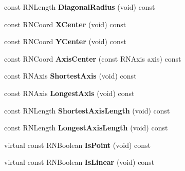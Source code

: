 \begin{DoxyCompactItemize}
\item 
const R\+N\+Length {\bfseries Diagonal\+Radius} (void) const \hypertarget{class_r2_box_a00ab031acf3086b5c738e409072628b9}{}\label{class_r2_box_a00ab031acf3086b5c738e409072628b9}

\item 
const R\+N\+Coord {\bfseries X\+Center} (void) const \hypertarget{class_r2_box_a4d7137a8b33d25073488f9beb6fee01b}{}\label{class_r2_box_a4d7137a8b33d25073488f9beb6fee01b}

\item 
const R\+N\+Coord {\bfseries Y\+Center} (void) const \hypertarget{class_r2_box_ad5a3bbf14b4905e364ad04a305c669aa}{}\label{class_r2_box_ad5a3bbf14b4905e364ad04a305c669aa}

\item 
const R\+N\+Coord {\bfseries Axis\+Center} (const R\+N\+Axis axis) const \hypertarget{class_r2_box_af3af7a7848270df64621b09bf4678ad0}{}\label{class_r2_box_af3af7a7848270df64621b09bf4678ad0}

\item 
const R\+N\+Axis {\bfseries Shortest\+Axis} (void) const \hypertarget{class_r2_box_a7168b00e526e0881910495d3335b5f9f}{}\label{class_r2_box_a7168b00e526e0881910495d3335b5f9f}

\item 
const R\+N\+Axis {\bfseries Longest\+Axis} (void) const \hypertarget{class_r2_box_a65ba59f99e319f658d460b3fd3f9807e}{}\label{class_r2_box_a65ba59f99e319f658d460b3fd3f9807e}

\item 
const R\+N\+Length {\bfseries Shortest\+Axis\+Length} (void) const \hypertarget{class_r2_box_adf1422c1522ea28a7f7014b531634996}{}\label{class_r2_box_adf1422c1522ea28a7f7014b531634996}

\item 
const R\+N\+Length {\bfseries Longest\+Axis\+Length} (void) const \hypertarget{class_r2_box_ac695d89dd62d9974c661fa8d22a42730}{}\label{class_r2_box_ac695d89dd62d9974c661fa8d22a42730}

\item 
virtual const R\+N\+Boolean {\bfseries Is\+Point} (void) const \hypertarget{class_r2_box_a74202d8d53552e6d2da87f94276e86e9}{}\label{class_r2_box_a74202d8d53552e6d2da87f94276e86e9}

\item 
virtual const R\+N\+Boolean {\bfseries Is\+Linear} (void) const \hypertarget{class_r2_box_a50c23ec05b1714263249c3d025caa1fd}{}\label{class_r2_box_a50c23ec05b1714263249c3d025caa1fd}


\end{DoxyCompactItemize}
